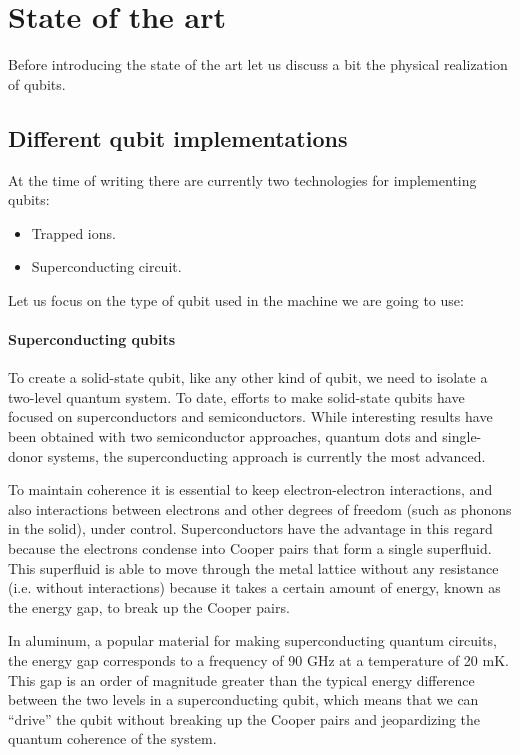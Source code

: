 \section{State of the art}

Before introducing the state of the art let us discuss a bit the physical realization of qubits.
\subsection{Different qubit implementations}

At the time of writing there are currently two technologies for implementing qubits:
\begin{itemize}
\item Trapped ions.
\item Superconducting circuit.
\end{itemize}

Let us focus on the type of qubit used in the machine we are going to use:
\paragraph{Superconducting qubits}
To create a solid-state qubit, like any other kind of qubit, we need to isolate a two-level quantum system. To date, efforts to make solid-state qubits have focused on superconductors and semiconductors. While interesting results have been obtained with two semiconductor approaches, quantum dots and single-donor systems, the superconducting approach is currently the most advanced.

To maintain coherence it is essential to keep electron-electron interactions, and also interactions between electrons and other degrees of freedom (such as phonons in the solid), under control. Superconductors have the advantage in this regard because the electrons condense into Cooper pairs that form a single superfluid. This superfluid is able to move through the metal lattice without any resistance (i.e. without interactions) because it takes a certain amount of energy, known as the energy gap, to break up the Cooper pairs.

In aluminum, a popular material for making superconducting quantum circuits, the energy gap corresponds to a frequency of 90 GHz at a temperature of 20 mK. This gap is an order of magnitude greater than the typical energy difference between the two levels in a superconducting qubit, which means that we can “drive” the qubit without breaking up the Cooper pairs and jeopardizing the quantum coherence of the system.

